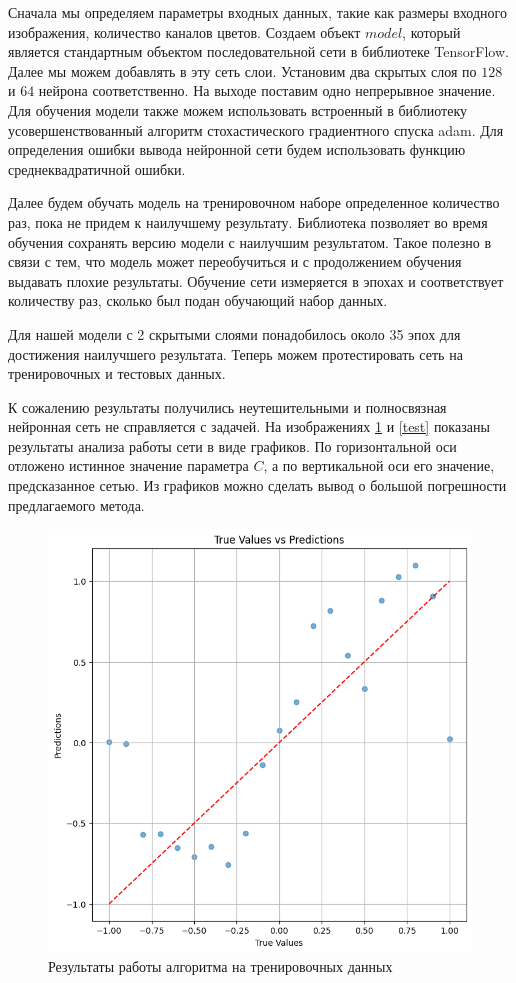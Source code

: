 \documentclass[12pt, a4paper]{article}
\begin{document}
	Сначала мы определяем параметры входных данных, такие как размеры входного изображения, количество каналов цветов. Создаем объект $model$, который является стандартным объектом последовательной сети в библиотеке TensorFlow. Далее мы можем добавлять в эту сеть слои. Установим два скрытых слоя по $128$ и $64$ нейрона соответственно. На выходе поставим одно непрерывное значение. Для обучения модели также можем использовать встроенный в библиотеку усовершенствованный алгоритм стохастического градиентного спуска adam. Для определения ошибки вывода нейронной сети будем использовать функцию среднеквадратичной ошибки.
	
	Далее будем обучать модель на тренировочном наборе определенное количество раз, пока не придем к наилучшему результату. Библиотека позволяет во время обучения сохранять версию модели с наилучшим результатом. Такое полезно в связи с тем, что модель может переобучиться и с продолжением обучения выдавать плохие результаты. Обучение сети измеряется в эпохах и соответствует количеству раз, сколько был подан обучающий набор данных.
	
	Для нашей модели с 2 скрытыми слоями понадобилось около 35 эпох для достижения наилучшего результата. Теперь можем протестировать сеть на тренировочных и тестовых данных. 
	
	К сожалению результаты получились неутешительными и полносвязная нейронная сеть не справляется с задачей. На изображениях \ref{train} и \ref{test} показаны результаты анализа работы сети в виде графиков. По горизонтальной оси отложено истинное значение параметра $C$, а по вертикальной оси его значение, предсказанное сетью. Из графиков можно сделать вывод о большой погрешности предлагаемого метода.
	
	\begin{figure}[!h]
		\centering
		\includegraphics[width=1\linewidth]{test_output}
		\caption{Результаты работы алгоритма на тренировочных данных}
		\label{train}
	\end{figure}
	
\end{document}
